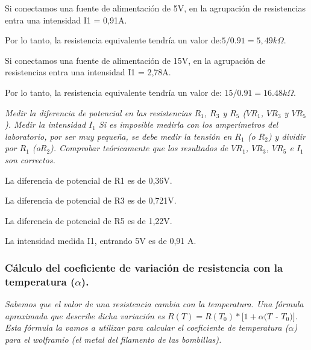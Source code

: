 \documentclass[paper=a4, fontsize=11pt]{scrartcl} %
\numberwithin{equation}{section} %
\numberwithin{figure}{section} %
\numberwithin{table}{section} %
\begin{document}
Si conectamos una fuente de alimentación de 5V, en la agrupación de resistencias entra una intensidad I1 = 0,91A.\newline

Por lo tanto, la resistencia equivalente tendría un valor de:$  5/0.91 = 5,49k \Omega $.

Si conectamos una fuente de alimentación de 15V, en la agrupación de resistencias entra una intensidad I1 = 2,78A.\newline

Por lo tanto, la resistencia equivalente tendría un valor de: $ 15/0.91 = 16.48k \Omega. $\newline

\textit{Medir la diferencia de potencial en las resistencias $ R_{1} $, $ R_{3} $ y $ R_{5} $  ($VR_{1}$, $VR_{3}$ y $VR_{5}$). Medir la intensidad $ I_{1} $ Si es imposible medirla con los amperímetros del laboratorio, por ser muy pequeña, se debe medir la tensión en $ R_{1} $ (o $ R_{2} $) y dividir por $ R_{1} $ (o$  R_{2} $). Comprobar teóricamente que los resultados de $ VR_{1} $, $ VR_{3} $, $VR_{5} $ e $ I_{1} $ son correctos.} \newline

La diferencia de potencial de R1 es de 0,36V. \newline

La diferencia de potencial de R3 es de 0,721V. \newline

La diferencia de potencial de R5 es de 1,22V.\newline

La intensidad medida I1, entrando 5V es de 0,91 A.\newline

\subsubsection{Cálculo del coeficiente de variación de resistencia con la temperatura ($ \alpha $).} 

\textit{Sabemos que el valor de una resistencia cambia con la temperatura. Una fórmula aproximada que describe dicha variación es $ R(T)=R(T_{0})*[1 + \alpha (T $ - $ T_{0})] $. Esta fórmula la vamos a utilizar para calcular el coeficiente de temperatura ($ \alpha $) para el wolframio (el metal del filamento de las bombillas).} \newline
\end{document}
